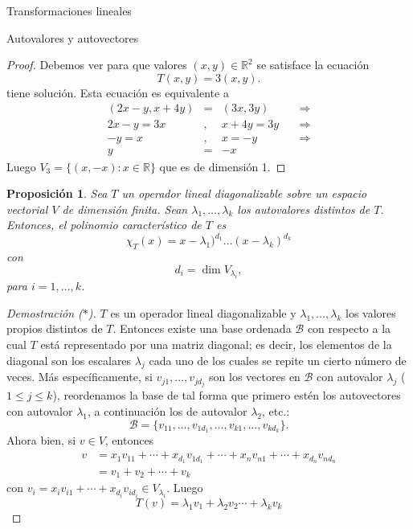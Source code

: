 \documentclass[a4paper,12pt,twoside,spanish]{amsbook}
\newtheorem{proposicion}[teorema]{Proposici\'on}
\theoremstyle{definition}
\theoremstyle{remark}
\newcommand{\R}{\mathbb R}
\begin{document}
\begin{chapter}{Transformaciones lineales}
\begin{section}{Autovalores y autovectores}
\begin{proof}
			Debemos ver para que valores  $(x,y)\in \R^2$ se satisface la ecuación
			$$
			T(x,y) = 3(x,y).
			$$
			tiene solución. Esta ecuación es equivalente a 
			\begin{equation*}
				\begin{array}{rcll}
				(2x-y,x+4y)&=&(3 x, 3 y)\quad &\Rightarrow \\
				2x-y = 3 x&,& x+4y = 3y \quad &\Rightarrow \\
				-y =  x&,& x = -y \quad &\Rightarrow \\
				y &=&  -x \quad &
				\end{array}
			\end{equation*}
			Luego $V_3 = \{(x,-x): x \in \R \}$ que es de dimensión 1.  	
			
		\end{proof}
	
		\begin{proposicion}
			 Sea $T$ un operador lineal diagonalizable sobre un espacio vectorial $V$ de dimensión finita. Sean $\lambda_1,\ldots,\lambda_k$ los autovalores distintos de $T$. Entonces,  el  polinomio característico de $T$ es
			 	$$
			 	\chi_T(x) = x -\lambda_1)^{d_1}\ldots(x -\lambda_k)^{d_k}
			 	$$
			 	con
			 	$$
			 	d_i =  \dim V_{\lambda_i},
			 	$$
			 	para  $i=1, \ldots, k$.
		\end{proposicion}
		\begin{proof}[Demostración ($*$)]
			$T$ es un operador lineal diagonalizable y $\lambda_1,\ldots,\lambda_k$ los valores propios distintos de $T$. Entonces existe una base ordenada $\mathcal B$ con respecto a la cual $T$ está representado por una matriz diagonal; es decir, los elementos de la diagonal son los escalares $\lambda_j$ cada uno de los cuales se repite un cierto número de veces. Más específicamente, si
			 $v_{j1},\ldots,v_{jd_j}$ son los vectores en $\mathcal{B}$ con autovalor $\lambda_j$ ($1 \le j \le k$),  reordenamos la base de tal forma que primero estén los autovectores con autovalor $\lambda_1$, a continuación los de autovalor $\lambda_2$, etc.: 
			\begin{equation*}
				\mathcal{B} = \{v_{11},\ldots,v_{1d_1},\ldots,v_{k1},\ldots,v_{kd_k}\}. 
			\end{equation*}
			Ahora bien,  si $v \in V$,  entonces 
			\begin{align*}
			v &=x_1v_{11}+\cdots+x_{d_1}v_{1d_1}+\cdots+x_nv_{n1}+\cdots+x_{d_n}v_{nd_n} \\
			&= v_1 + v_2 +\cdots + v_k
			\end{align*}
			con $v_i = x_iv_{i1}+\cdots+x_{d_i}v_{id_i} \in V_{\lambda_i}$. Luego
			\begin{equation}\label{eq-desc-vectores-propios}
				T(v)  =\lambda_1v_1+\lambda_2v_2\cdots+\lambda_kv_k
			\end{equation} 
			

\end{proof}
\end{section}
\end{chapter}
\end{document}

